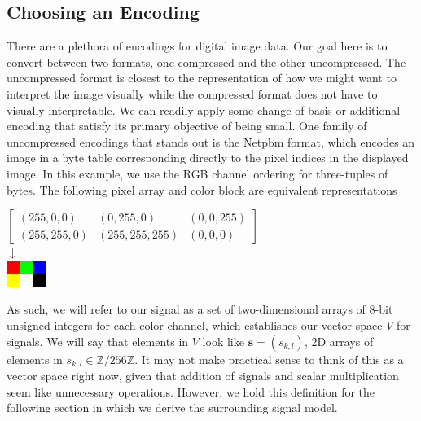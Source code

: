 \documentclass[12pt,technote]{IEEEtran}
\begin{document}
\subsection{Choosing an Encoding}
There are a plethora of encodings for digital image data. Our goal here is to convert between two formats, one compressed and the other uncompressed. The uncompressed format is closest to the representation of how we might want to interpret the image visually while the compressed format does not have to visually interpretable. We can readily apply some change of basis or additional encoding that satisfy its primary objective of being small. One family of uncompressed encodings that stands out is the Netpbm format, which encodes an image in a byte table corresponding directly to the pixel indices in the displayed image. In this example, we use the RGB channel ordering for three-tuples of bytes. The following pixel array and color block are equivalent representations

\begin{center}
    $\begin{bmatrix}
        (255, 0, 0) & (0, 255, 0) & (0, 0, 255)\\
        (255, 255, 0) & (255, 255, 255) & (0, 0, 0)
    \end{bmatrix}$\\
    $\downarrow$\\
    \includegraphics[width=0.5in]{figures/ppm_example.png}
\end{center}
As such, we will refer to our signal as a set of two-dimensional arrays of 8-bit unsigned integers for each color channel, which establishes our vector space $V$ for signals. We will say that elements in $V$ look like $\mathbf{s} = (s_{k,l})$, 2D arrays of elements in $s_{k,l}\in \mathbb{Z}/ 256\mathbb{Z}$. It may not make practical sense to think of this as a vector space right now, given that addition of signals and scalar multiplication seem like unnecessary operations. However, we hold this definition for the following section in which we derive the surrounding signal model.
\end{document}
